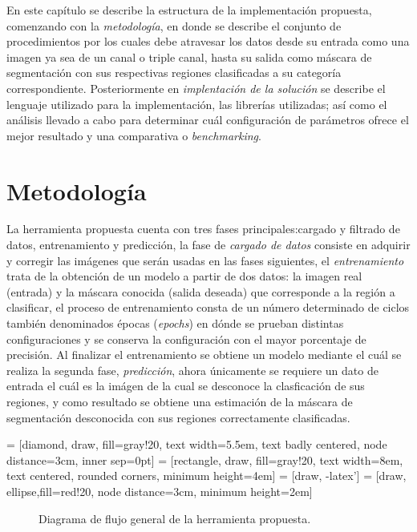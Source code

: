 En este capítulo se describe la estructura de la implementación propuesta, comenzando con la \emph{metodología}, en donde se describe el conjunto de procedimientos por los cuales debe atravesar los datos desde su entrada como una imagen ya sea de un canal o triple canal, hasta su salida como máscara de segmentación con sus respectivas regiones clasificadas a su categoría correspondiente. Posteriormente en \emph{implentación de la solución} se describe el lenguaje utilizado para la implementación, las librerías utilizadas; así como el análisis llevado a cabo para determinar cuál configuración de parámetros ofrece el mejor resultado y una comparativa o \emph{benchmarking}.

\section{Metodología}
La herramienta propuesta cuenta con tres fases principales:cargado y filtrado de datos, entrenamiento y predicción, la fase de \emph{cargado de datos} consiste en adquirir y corregir las imágenes que serán usadas en las fases siguientes, el \emph{entrenamiento} trata de la obtención de un modelo a partir de dos datos: la imagen real (entrada) y la máscara conocida (salida deseada) que corresponde a la región a clasificar, el proceso de entrenamiento consta de un número determinado de ciclos también denominados épocas (\emph{epochs}) en dónde se prueban distintas configuraciones y se conserva la configuración con el mayor porcentaje de precisión. Al finalizar el entrenamiento se obtiene un modelo mediante el cuál se realiza la segunda fase, \emph{predicción}, ahora únicamente se requiere un dato de entrada el cuál es la imágen de la cual se desconoce la clasficación de sus regiones, y como resultado se obtiene una estimación de la máscara de segmentación desconocida con sus regiones correctamente clasificadas.

 = [diamond, draw, fill=gray!20, 
    text width=5.5em, text badly centered, node distance=3cm, inner sep=0pt]
 = [rectangle, draw, fill=gray!20, 
    text width=8em, text centered, rounded corners, minimum height=4em]
 = [draw, -latex']
 = [draw, ellipse,fill=red!20, node distance=3cm,
    minimum height=2em]

\begin{figure}[b]
\centering    
{}
\caption{Diagrama de flujo general de la herramienta propuesta.}
\end{figure}


